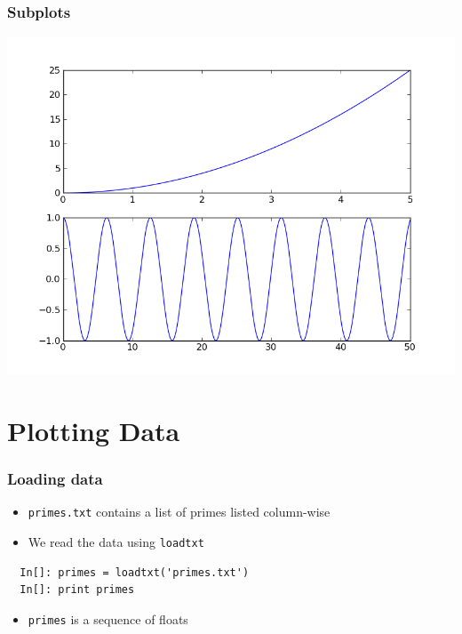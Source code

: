 \begin{frame}
\frametitle{Subplots}
\includegraphics[scale=0.45]{../advanced_python/images/subplot.png}\\
\end{frame}



\section{Plotting Data}

\begin{frame}[fragile]
  \frametitle{Loading data}
  \begin{itemize}
  \item \texttt{primes.txt} contains a list of primes listed
    column-wise
  \item We read the data using \texttt{loadtxt} 
  \end{itemize}
  \begin{lstlisting}
  In[]: primes = loadtxt('primes.txt')
  In[]: print primes
  \end{lstlisting}
  \begin{itemize}
  \item \texttt{primes} is a sequence of floats
  \end{itemize}
\end{frame}

